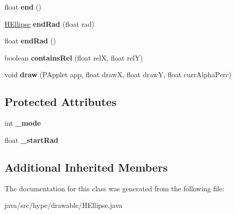 \begin{DoxyCompactItemize}
\item 
\hypertarget{classhype_1_1drawable_1_1_h_ellipse_a6ff1384aa920dcc6c15690057ae33c24}{float {\bfseries end} ()}\label{classhype_1_1drawable_1_1_h_ellipse_a6ff1384aa920dcc6c15690057ae33c24}

\item 
\hypertarget{classhype_1_1drawable_1_1_h_ellipse_a5b307e00cc0df0f7a9ebe8384a150e8d}{\hyperlink{classhype_1_1drawable_1_1_h_ellipse}{H\-Ellipse} {\bfseries end\-Rad} (float rad)}\label{classhype_1_1drawable_1_1_h_ellipse_a5b307e00cc0df0f7a9ebe8384a150e8d}

\item 
\hypertarget{classhype_1_1drawable_1_1_h_ellipse_a799cccf3358521b4594da6f2371132ee}{float {\bfseries end\-Rad} ()}\label{classhype_1_1drawable_1_1_h_ellipse_a799cccf3358521b4594da6f2371132ee}

\item 
\hypertarget{classhype_1_1drawable_1_1_h_ellipse_ac9695d60c9229944ae52e83e16b19b97}{boolean {\bfseries contains\-Rel} (float rel\-X, float rel\-Y)}\label{classhype_1_1drawable_1_1_h_ellipse_ac9695d60c9229944ae52e83e16b19b97}

\item 
\hypertarget{classhype_1_1drawable_1_1_h_ellipse_a94aa4d65e442b481e73eb3f14275fcfd}{void {\bfseries draw} (P\-Applet app, float draw\-X, float draw\-Y, float curr\-Alpha\-Perc)}\label{classhype_1_1drawable_1_1_h_ellipse_a94aa4d65e442b481e73eb3f14275fcfd}

\end{DoxyCompactItemize}
\subsection*{Protected Attributes}
\begin{DoxyCompactItemize}
\item 
\hypertarget{classhype_1_1drawable_1_1_h_ellipse_aa135a1010364048f6c02b7a01451cc8e}{int {\bfseries \-\_\-mode}}\label{classhype_1_1drawable_1_1_h_ellipse_aa135a1010364048f6c02b7a01451cc8e}

\item 
\hypertarget{classhype_1_1drawable_1_1_h_ellipse_a68c2277274139f7b1866f5b49812457f}{float {\bfseries \-\_\-start\-Rad}}\label{classhype_1_1drawable_1_1_h_ellipse_a68c2277274139f7b1866f5b49812457f}

\end{DoxyCompactItemize}
\subsection*{Additional Inherited Members}


The documentation for this class was generated from the following file\-:\begin{DoxyCompactItemize}
\item 
java/src/hype/drawable/H\-Ellipse.\-java\end{DoxyCompactItemize}
